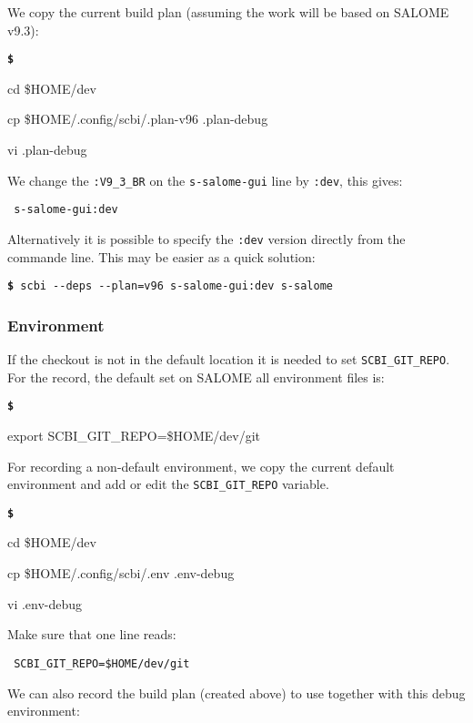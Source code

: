 \documentclass[a4paper,12pt,twoside]{article}
\newenvironment{shellcommand}{
	\begin{list}{ %
			\bfseries\texttt \$
		}{ %
			\ttfamily
			\setlength{\topsep}{-0.3ex}
			\setlength{\labelwidth}{1in}
			\setlength{\leftmargin}{0.7in}
			\setlength{\labelsep}{0.5ex}
			\setlength{\rightmargin}{0.5in}
			\setlength{\itemsep}{1ex}
			\setlength{\parsep}{0ex}
			\setlength{\listparindent}{0.5in}
		}
	}{
	\end{list}
}
\newcommand{\code}[1]{\texttt{#1}}
\newcommand{\cmd}[1]{\tabto{1cm}\hspace{0.5cm}\texttt{\textbf{\$} #1}}
\newcommand{\ddash}{-{}-}
\begin{document}
We copy the current build plan (assuming the work will be based on SALOME v9.3):

\begin{shellcommand}
	\item cd \$HOME/dev
	\item cp \$HOME/.config/scbi/.plan-v96 .plan-debug
	\item vi .plan-debug
\end{shellcommand}

We change the \code{:V9\_3\_BR} on the \code{s-salome-gui} line by \code{:dev}, this gives:

\begin{lstlisting}
 s-salome-gui:dev
\end{lstlisting}

Alternatively it is possible to specify the \code{:dev} version directly from the commande line. This may be easier as a quick solution:

\cmd{scbi \ddash{}deps \ddash{}plan=v96 s-salome-gui:dev s-salome}

\subsubsection{Environment}

If the checkout is not in the default location it is needed to set \code{SCBI\_GIT\_REPO}. For the record, the default set on SALOME all environment files is:

\begin{shellcommand}
	\item export SCBI\_GIT\_REPO=\$HOME/dev/git
\end{shellcommand}

For recording a non-default environment, we copy the current default environment and add or edit the \code{SCBI\_GIT\_REPO} variable.

\begin{shellcommand}
	\item cd \$HOME/dev
	\item cp \$HOME/.config/scbi/.env .env-debug
	\item vi .env-debug
\end{shellcommand}

Make sure that one line reads:

\begin{lstlisting}
 SCBI_GIT_REPO=$HOME/dev/git
\end{lstlisting}

We can also record the build plan (created above) to use together with this debug environment:
\end{document}
